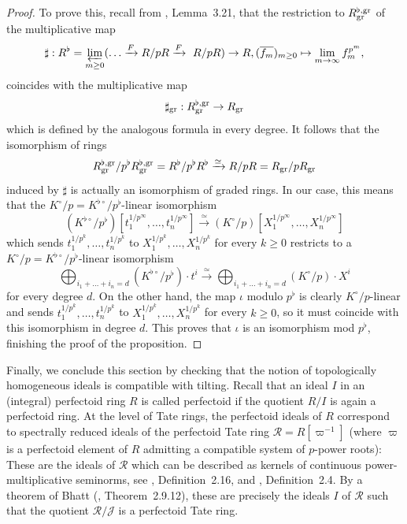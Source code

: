 \documentclass[12pt,twoside,a4paper]{article}
\theoremstyle{definition}
\theoremstyle{remark}
\newcommand\gr{{\rm gr}}
\begin{document}
\begin{proof}
To prove this, recall from \cite{Ishizuka-Yoshikawa25}, Lemma~3.21, that the restriction to $R_{\gr}^{\flat,\gr}$ of the multiplicative map \begin{equation*}\sharp: R^{\flat}=\varprojlim_{m\geq0}(\dots \xrightarrow{F} R/pR \xrightarrow{F} R/pR) \to R, (\overline{f_{m}})_{m\geq0}\mapsto \lim_{m\to \infty}f_{m}^{p^{m}},\end{equation*}coincides with the multiplicative map\begin{equation*}\sharp_{\gr}: R_{\gr}^{\flat,\gr}\to R_{\gr}\end{equation*}which is defined by the analogous formula in every degree. It follows that the isomorphism of rings \begin{equation*}R_{\gr}^{\flat,\gr}/p^{\flat}R_{\gr}^{\flat,\gr}=R^{\flat}/p^{\flat}R^{\flat}\xrightarrow{\simeq}R/pR=R_{\gr}/pR_{\gr}\end{equation*}induced by $\sharp$ is actually an isomorphism of graded rings. In our case, this means that the $K^{\circ}/p=K^{\flat\circ}/p^{\flat}$-linear isomorphism \begin{equation*}(K^{\flat\circ}/p^{\flat})[t_{1}^{1/p^{\infty}},\dots, t_{n}^{1/p^{\infty}}]\xrightarrow{\simeq}(K^{\circ}/p)[X_{1}^{1/p^{\infty}},\dots, X_{n}^{1/p^{\infty}}]\end{equation*}which sends $t_{1}^{1/p^{k}},\dots, t_{n}^{1/p^{k}}$ to $X_{1}^{1/p^{k}},\dots, X_{n}^{1/p^{k}}$ for every $k\geq0$ restricts to a $K^{\circ}/p=K^{\flat\circ}/p^{\flat}$-linear isomorphism \begin{equation*}\bigoplus_{i_1+\dots+i_n=d}(K^{\flat\circ}/p^{\flat})\cdot t^{i}\xrightarrow{\simeq} \bigoplus_{i_1+\dots+i_n=d}(K^{\circ}/p)\cdot X^{i}\end{equation*}for every degree $d$. On the other hand, the map $\iota$ modulo $p^{\flat}$ is clearly $K^{\circ}/p$-linear and sends $t_{1}^{1/p^{k}},\dots, t_{n}^{1/p^{k}}$ to $X_{1}^{1/p^{k}},\dots, X_{n}^{1/p^{k}}$ for every $k\geq0$, so it must coincide with this isomorphism in degree $d$. This proves that $\iota$ is an isomorphism mod $p^{\flat}$, finishing the proof of the proposition. \end{proof}
Finally, we conclude this section by checking that the notion of topologically homogeneous ideals is compatible with tilting. Recall that an ideal $I$ in an (integral) perfectoid ring $R$ is called perfectoid if the quotient $R/I$ is again a perfectoid ring. At the level of Tate rings, the perfectoid ideals of $R$ correspond to spectrally reduced ideals of the perfectoid Tate ring $\mathcal{R}=R[\varpi^{-1}]$ (where $\varpi$ is a perfectoid element of $R$ admitting a compatible system of $p$-power roots): These are the ideals of $\mathcal{R}$ which can be described as kernels of continuous power-multiplicative seminorms, see \cite{Dine22}, Definition~2.16, and \cite{Dine-Ishizuka23}, Definition~2.4. By a theorem of Bhatt (\cite{Kedlaya17}, Theorem~2.9.12), these are precisely the ideals $I$ of $\mathcal{R}$ such that the quotient $\mathcal{R}/\mathcal{J}$ is a perfectoid Tate ring. 
\end{document}
